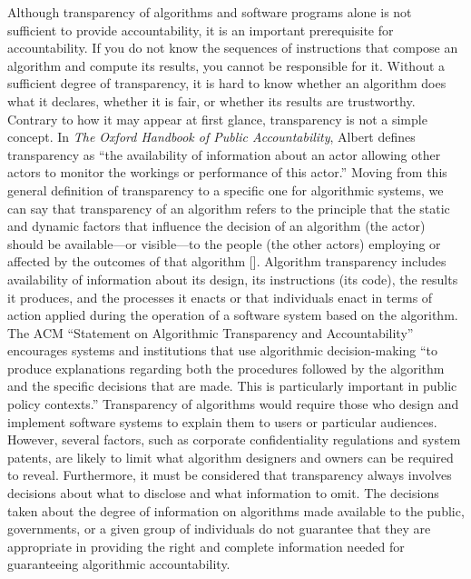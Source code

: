 Although transparency of algorithms and software programs alone is not sufficient to provide accountability, it is an important prerequisite for accountability. If you do not know the sequences of instructions that compose an algorithm and compute its results, you cannot be responsible for it. Without a sufficient degree of transparency, it is hard to know whether an algorithm does what it declares, whether it is fair, or whether its results are trustworthy. Contrary to how it may appear at first glance, transparency is not a simple concept. In \textit{The Oxford Handbook of Public Accountability}, Albert \citet{chap:10:Meijer:2014} defines transparency as ``the availability of information about an actor allowing other actors to monitor the workings or performance of this actor.'' Moving from this general definition of transparency to a specific one for algorithmic systems, we can say that transparency of an algorithm refers to the principle that the static and dynamic factors that influence the decision of an algorithm (the actor) should be available---or visible---to the \hbox{people} (the other actors) employing or affected by the outcomes of that algorithm [\citealt{chap:10:DiakopoulosandKoliska:2017}]. Algorithm transparency includes availability of information about its design, its instructions (its code), the results it produces, and the processes it enacts or that individuals enact in terms of action applied during the operation of a software system based on the algorithm. The ACM ``Statement on Algorithmic Transparency and Accountability'' encourages systems and institutions that use algorithmic decision-making ``to produce explanations regarding both the procedures followed by the algorithm and the specific decisions that are made. This is particularly important in public policy contexts.'' Transparency of algorithms would require those who design and implement software systems to explain them to users or particular audiences. However, several factors, such as corporate confidentiality regulations and system patents, are likely to limit what algorithm designers and owners can be required to reveal. Furthermore, it must be considered that transparency always involves decisions about what to disclose and what information to omit. The decisions taken about the degree of information on algorithms made available to the public, governments, or a given group of individuals do not guarantee that they are appropriate in providing the right and complete information needed for guaranteeing algorithmic accountability.

